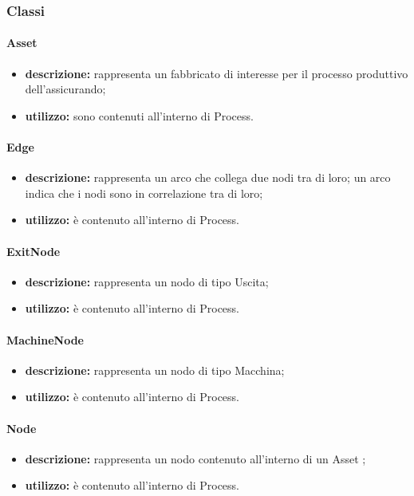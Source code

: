 \subsubsection{Classi}
\paragraph{Asset}
\begin{itemize}
	\item \textbf{descrizione:} rappresenta un fabbricato di interesse per il processo produttivo dell'assicurando;
	\item \textbf{utilizzo:} sono contenuti all'interno di Process.
\end{itemize}
\paragraph{Edge}
\begin{itemize}
	\item \textbf{descrizione:} rappresenta un arco che collega due nodi tra di loro; un arco indica che i nodi sono in correlazione tra di loro;
	\item \textbf{utilizzo:} è contenuto all'interno di Process.
\end{itemize}
\paragraph{ExitNode}
\begin{itemize}
	\item \textbf{descrizione:} rappresenta un nodo di tipo Uscita;
	\item \textbf{utilizzo:} è contenuto all'interno di Process.
\end{itemize}
\paragraph{MachineNode}
\begin{itemize}
	\item \textbf{descrizione:} rappresenta un nodo di tipo Macchina;
	\item \textbf{utilizzo:} è contenuto all'interno di Process.
\end{itemize}
\paragraph{Node}
\begin{itemize}
	\item \textbf{descrizione:} rappresenta un nodo contenuto all'interno di un Asset ;
	\item \textbf{utilizzo:} è contenuto all'interno di Process.
\end{itemize}
